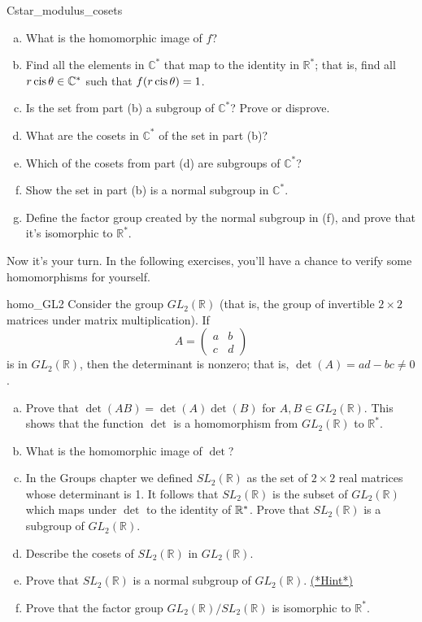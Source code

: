 \begin{exercise}{Cstar_modulus_cosets}
\begin{enumerate}[(a)]
\item
What is the homomorphic image of $f$?
\item
Find all the elements in ${\mathbb C}^\ast$ that map  to the identity in ${\mathbb R}^\ast$; that is, find all $r \operatorname{cis} \theta \in {\mathbb C}^\ast$ such that $f(r \operatorname{cis} \theta) = 1$.
\item
Is the set from part (b) a subgroup of ${\mathbb C}^\ast$?  Prove or disprove.
\item
What are the cosets in ${\mathbb C}^\ast$ of the set in part (b)?
\item
Which of the cosets from part (d) are subgroups of ${\mathbb C}^\ast$?
\item
Show the set in part (b) is a normal subgroup in ${\mathbb C}^\ast$.
\item
Define the factor group created by the normal subgroup in (f), and prove that it's isomorphic to  ${\mathbb R}^\ast$.
\end{enumerate}
\end{exercise}
 

Now it's your turn. In the following exercises, you'll have a chance  to verify some homomorphisms for yourself.

\begin{exercise}{homo_GL2}
Consider the group $GL_2( {\mathbb R })$ (that is, the group of invertible $2 \times 2$ matrices under matrix multiplication). If
\[
A=
\begin{pmatrix}
a & b \\
c & d
\end{pmatrix}
\]
is in $GL_2( {\mathbb R })$, then the determinant is  nonzero; that is, $\det(A) = ad -bc
\neq 0$.  

\begin{enumerate}[(a)]
\item
Prove that $\det( AB) = \det(A) \det(B)$ for $A, B \in GL_2( {\mathbb R}
)$. This shows that the function $\det$ is a homomorphism from $ GL_2( {\mathbb R })$ to ${\mathbb R}^\ast$.

\item
What is the homomorphic image of $\det$?
\item
In the Groups chapter we defined $SL_2( {\mathbb R })$ as the set of $2 \times 2$ real matrices whose determinant is 1. It follows that $SL_2( {\mathbb R })$ is the subset of $GL_2( {\mathbb R })$ which maps under $\det$ to the identity of $\mathbb{R}^*$. Prove that $SL_2( {\mathbb R })$ is a subgroup of $GL_2( {\mathbb R })$.
\item
Describe the cosets of $SL_2( {\mathbb R })$ in $GL_2( {\mathbb R })$.
\item
Prove that $SL_2( {\mathbb R })$ is a normal subgroup of $GL_2( {\mathbb R })$. 
\hyperref[sec:homomorph:hints]{(*Hint*)} 
\item
Prove that the factor group $GL_2( {\mathbb R }) / SL_2( {\mathbb R })$ is isomorphic to ${\mathbb R}^\ast$.
\end{enumerate}  
\end{exercise}

